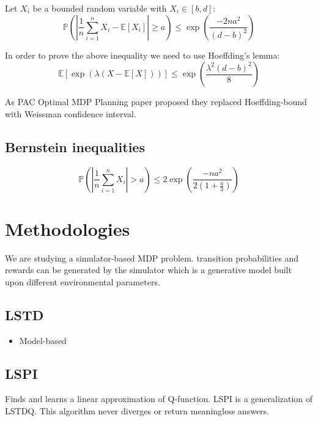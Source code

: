 \documentclass[a4paper,12pt]{article}
\begin{document}
Let $X_i$ be a bounded random variable with $X_i \in [b, d]$:
\begin{equation}
    \mathbb {P} \left( \left| \frac{1}{n} \sum_{i=1}^{n} X_i - \mathbb{E}[X_i] \right| \geq a \right) \leq { \exp \left( \frac{-2 n a ^ {2} }{ \left(d-b \right) ^ 2} \right) }
\end{equation}

In order to prove the above inequality we need to use Hoeffding's lemma:
\begin{equation}
    \mathbb {E} \left[ \exp \left( {\lambda ( X - \mathbb {E}[X] )} \right)  \right] \leq \exp \left( \frac{\lambda ^ 2 (d-b)^2}{8} \right)
\end{equation}

As PAC Optimal MDP Planning paper \cite{AlkaeeTaleghan2015a} proposed they replaced Hoeffding-bound with Weissman confidence interval.

\subsection{Bernstein inequalities}
\begin{equation}
    \mathbb { P } \left( \left| \frac { 1 } { n } \sum _ { i = 1 } ^ { n } X _ { i } \right| > a \right) \leq 2 \exp \left( \frac {- n a ^ {2} } { 2 \left( 1 + \frac {a} {3} \right) } \right)
\end{equation}


\section{Methodologies}
We are studying a simulator-based MDP problem. transition probabilities and rewards can be generated by the simulator which is a generative model built upon different environmental parameters.

\subsection{LSTD}
\begin{itemize}
    \item Model-based \cite{Boyan1998}
\end{itemize}

\subsection{LSPI}
Finds and learns a linear approximation of Q-function. LSPI is a generalization of LSTDQ. This algorithm never diverges or return meaningless answers.
\end{document}
